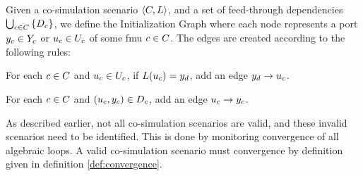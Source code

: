 \documentclass[runningheads]{llncs}
\begin{document}
\begin{definition}\label{def:initialization_graph}
  Given a co-simulation scenario $ \left\langle C, L \right\rangle $, and a set of feed-through dependencies $\bigcup_{c \in C}  \left\{ D_{c} \right\}$, we define the Initialization Graph where each node represents a port $y_{c} \in Y_{c}$ or $u_{c} \in U_{c}$ of some fmu $c \in C$. The edges are created according to the following rules:
  \begin{compactenum}
    \item For each $c \in C$ and $u_{c} \in U_{c}$, if $L(u_{c}) = y_{d}$, add an edge $y_{d} -> u_{c}$.
    \item For each $c \in C$ and $(u_{c},y_{c}) \in D_{c}$, add an edge $u_{c} -> y_{c}$.
  \end{compactenum}
\end{definition}

As described earlier, not all co-simulation scenarios are valid, and these invalid scenarios need to be identified. This is done by monitoring convergence of all algebraic loops. A valid co-simulation scenario must convergence by definition given in definition \ref{def:convergence}.
\end{document}
